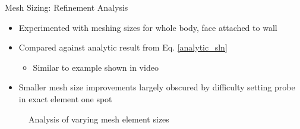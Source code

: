 \documentclass[11pt]{beamer}
\begin{document}
    \begin{frame}{Mesh Sizing: Refinement Analysis}
       \centering
       \begin{itemize} 
           \item Experimented with meshing sizes for whole body, face attached to wall
           \item Compared against analytic result from Eq. \eqref{analytic_sln}
           \begin{itemize} 
                \item Similar to example shown in video
            \end{itemize}
           \item Smaller mesh size improvements largely obscured by difficulty setting probe in exact element one spot

       \end{itemize}

        \begin{figure} 
            \centering
            \begin{table}
                \hspace{-15pt}
                \caption{Analysis of varying mesh element sizes}
                \label{tab:meshsizes}
            \end{table}
        \end{figure}
    \end{frame}
\end{document}

